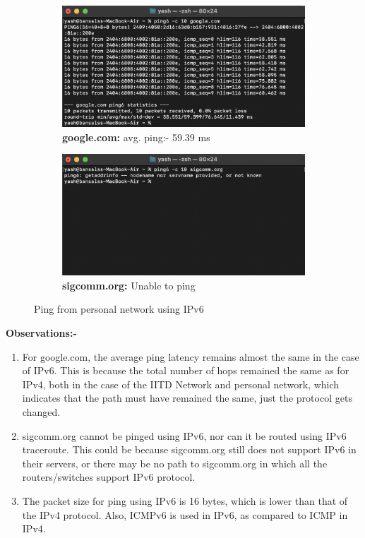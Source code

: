 \documentclass{article}
\begin{document}
\begin{figure}[H]
    \centering
    \begin{subfigure}[b]{0.48\textwidth}
        \centering
        \includegraphics[width=\textwidth]{ping_google_personal_ipv6.png}
        \caption*{\textbf{google.com:} avg. ping:- 59.39 ms}
    \end{subfigure}
    \hfill
    \begin{subfigure}[b]{0.48\textwidth}
        \centering
        \includegraphics[width=\textwidth]{ping_sigcomm_personal_ipv6.png}
        \caption*{\textbf{sigcomm.org:} Unable to ping}
    \end{subfigure}
    \caption*{Ping from personal network using IPv6}
\end{figure}

\textbf{Observations:- }
\begin{enumerate}
    \item For google.com, the average ping latency remains almost the same in the case of IPv6. This is because the total number of hops remained the same as for IPv4, both in the case of the IITD Network and personal network, which indicates that the path must have remained the same, just the protocol gets changed.
    \item sigcomm.org cannot be pinged using IPv6, nor can it be routed using IPv6 traceroute. This could be because sigcomm.org still does not support IPv6 in their servers, or there may be no path to sigcomm.org in which all the routers/switches support IPv6 protocol.
    \item The packet size for ping using IPv6 is 16 bytes, which is lower than that of the IPv4 protocol. Also, ICMPv6 is used in IPv6, as compared to ICMP in IPv4.
\end{enumerate}
\newpage
\end{document}
